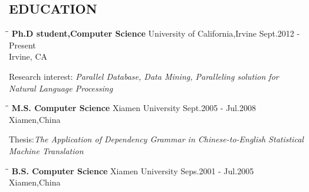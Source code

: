 \documentclass{res}
\begin{document}
\begin{resume}
\section{EDUCATION}          
   \vspace{-0.1in}	
   \begin{tabbing}
   \hspace{2.3in}\= \hspace{2.6in}\= \kill %
    {\bf Ph.D student,Computer Science} \>  University of California,Irvine \>Sept.2012 - Present\\
                             \>Irvine, CA
   \end{tabbing}\vspace{-20pt}      %
   Research interest:\emph{ Parallel Database, Data Mining, Paralleling solution for Natural Language Processing}
   \begin{tabbing}
   \hspace{2.3in}\= \hspace{2.6in}\= \kill %
    {\bf M.S. Computer Science} \>Xiamen University     \>Sept.2005 - Jul.2008\\
                             \>Xiamen,China
   \end{tabbing}\vspace{-20pt}      %
    Thesis:\emph{The Application of Dependency Grammar in Chinese-to-English Statistical Machine Translation}
   \begin{tabbing}
   \hspace{2.3in}\= \hspace{2.6in}\= \kill %
    {\bf B.S. Computer Science} \>Xiamen University     \>Seps.2001 - Jul.2005\\
                             \>Xiamen,China
   \end{tabbing}\vspace{-20pt}      %
 

\end{resume}
\end{document}
